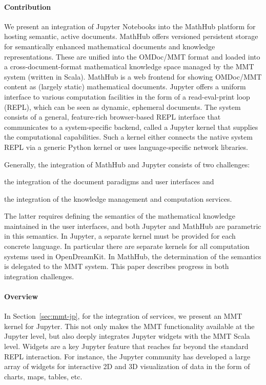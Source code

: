 \paragraph{Contribution}
We present an integration of Jupyter Notebooks into the MathHub platform for hosting semantic, active documents.
MathHub offers versioned persistent storage for semantically enhanced mathematical documents and knowledge representations.
These are unified into the OMDoc/MMT format and loaded into a cross-document-format mathematical knowledge space managed by the MMT system (written in Scala).  
MathHub is a web frontend for showing OMDoc/MMT content as (largely static) mathematical documents.
Jupyter offers a uniform interface to various computation facilities in the form of a read-eval-print loop (REPL), which can be seen as dynamic, ephemeral documents.
The system consists of a general, feature-rich browser-based REPL interface that communicates to a system-specific backend, called a Jupyter kernel that supplies the computational capabilities.
Such a kernel either connects the native system REPL via a generic Python kernel or uses language-specific network libraries. 

Generally, the integration of MathHub and Jupyter consists of two challenges:
\begin{compactenum}[\em i\rm )]
\item the integration of the document paradigms and user interfaces 
and
\item the integration of the knowledge management and computation services.
\end{compactenum}
The latter requires defining the semantics of the mathematical knowledge maintained in the user interfaces, and both Jupyter and MathHub are parametric in this semantics.
In Jupyter, a separate kernel must be provided for each concrete language.
In particular there are separate kernels for all computation systems used in OpenDreamKit.
In MathHub, the determination of the semantics is delegated to the MMT system. This paper describes progress in both integration challenges.

\paragraph{Overview} In Section~\ref{sec:mmt-jp}, for the integration of services, we present an MMT kernel for Jupyter.
This not only makes the MMT functionality available at the Jupyter level, but also deeply integrates Jupyter widgets with the MMT Scala level.
Widgets are a key Jupyter feature that reaches far beyond the standard REPL interaction.
For instance, the Jupyter community has developed a large array of widgets for interactive 2D and 3D visualization of data in the form of charts, maps, tables, etc.

